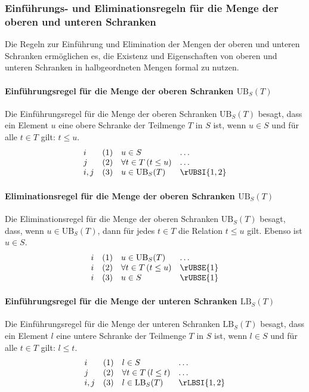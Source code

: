 \documentclass[main.tex]{subfiles}
\begin{document}
\subsubsection{Einführungs- und Eliminationsregeln für die Menge der oberen und unteren Schranken}
\label{rule:rUBSI} \label{rule:rUBSE} \label{rule:rLBSI} \label{rule:rLBSE}

Die Regeln zur Einführung und Elimination der Mengen der oberen und unteren Schranken ermöglichen es, die Existenz und Eigenschaften von oberen und unteren Schranken in halbgeordneten Mengen formal zu nutzen.

\paragraph{Einführungsregel für die Menge der oberen Schranken \(\text{UB}_S(T)\)}
Die Einführungsregel für die Menge der oberen Schranken \(\text{UB}_S(T)\) besagt, dass ein Element \(u\) eine obere Schranke der Teilmenge \(T\) in \( S \) ist, wenn \(u \in S\) und für alle \(t \in T\) gilt: \(t \leq u\).
\[
\begin{array}{llll}
    i   & (1) & u \in S & \dots \\
    j   & (2) & \forall t \in T \, (t \leq u) & \dots \\
    i,j & (3) & u \in \text{UB}_S(T) & \rUBSI{1,2}
\end{array}
\]

\paragraph{Eliminationsregel für die Menge der oberen Schranken \(\text{UB}_S(T)\)}
Die Eliminationsregel für die Menge der oberen Schranken \(\text{UB}_S(T)\) besagt, dass, wenn \(u \in \text{UB}_S(T)\), dann für jedes \(t \in T\) die Relation \(t \leq u\) gilt. Ebenso ist \(u \in S\).
\[
\begin{array}{llll}
    i & (1) & u \in \text{UB}_S(T) & \dots \\
    i & (2) & \forall t \in T \, (t \leq u) & \rUBSE{1} \\
    i & (3) & u \in S & \rUBSE{1}
\end{array}
\]

\paragraph{Einführungsregel für die Menge der unteren Schranken \(\text{LB}_S(T)\)}
Die Einführungsregel für die Menge der unteren Schranken \(\text{LB}_S(T)\) besagt, dass ein Element \(l\) eine untere Schranke der Teilmenge \(T\) in \( S \) ist, wenn \(l \in S\) und für alle \(t \in T\) gilt: \(l \leq t\).
\[
\begin{array}{llll}
    i   & (1) & l \in S & \dots \\
    j   & (2) & \forall t \in T \, (l \leq t) & \dots \\
    i,j & (3) & l \in \text{LB}_S(T) & \rLBSI{1,2}
\end{array}
\]
\end{document}
